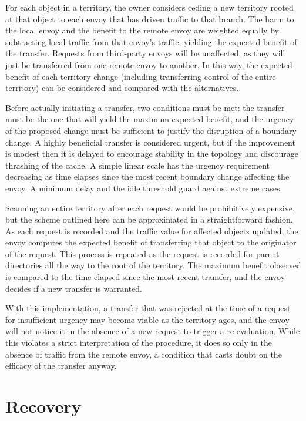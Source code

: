 For each object in a territory, the owner considers ceding a new territory rooted at that object to each envoy that has driven traffic to that branch. The harm to the local envoy and the benefit to the remote envoy are weighted equally by subtracting local traffic from that envoy's traffic, yielding the expected benefit of the transfer. Requests from third-party envoys will be unaffected, as they will just be transferred from one remote envoy to another. In this way, the expected benefit of each territory change (including transferring control of the entire territory) can be considered and compared with the alternatives.

Before actually initiating a transfer, two conditions must be met: the transfer must be the one that will yield the maximum expected benefit, and the urgency of the proposed change must be sufficient to justify the disruption of a boundary change. A highly beneficial transfer is considered urgent, but if the improvement is modest then it is delayed to encourage stability in the topology and discourage thrashing of the cache. A simple linear scale has the urgency requirement decreasing as time elapses since the most recent boundary change affecting the envoy. A minimum delay and the idle threshold guard against extreme cases.

Scanning an entire territory after each request would be prohibitively expensive, but the scheme outlined here can be approximated in a straightforward fashion. As each request is recorded and the traffic value for affected objects updated, the envoy computes the expected benefit of transferring that object to the originator of the request. This process is repeated as the request is recorded for parent directories all the way to the root of the territory. The maximum benefit observed is compared to the time elapsed since the most recent transfer, and the envoy decides if a new transfer is warranted.

With this implementation, a transfer that was rejected at the time of a request for insufficient urgency may become viable as the territory ages, and the envoy will not notice it in the absence of a new request to trigger a re-evaluation. While this violates a strict interpretation of the procedure, it does so only in the absence of traffic from the remote envoy, a condition that casts doubt on the efficacy of the transfer anyway.

\section{Recovery}\label{sec:envoy-recovery}

